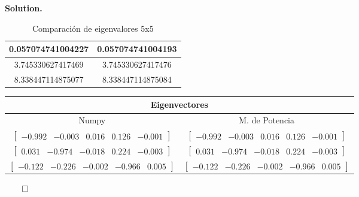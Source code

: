 \documentclass{article}
\theoremstyle{problemstyle}
\newenvironment{solution}{%
  \begin{mdframed}[linewidth=0.8pt,linecolor=Gray,backgroundcolor=Gray!5,roundcorner=5pt]%
  \noindent\textbf{Solution.}%
}{%
\hfill $ \qed $ 
  \end{mdframed}%
}
\begin{document}
\begin{solution}
\begin{table}[H]
\begin{center}
\begin{tabular}{|c|c|}
            0.057074741004227 & 0.057074741004193 \\
            \hline
            3.745330627417469 & 3.745330627417476 \\
            \hline
            8.338447114875077 & 8.338447114875084 \\
            \hline
        \end{tabular}
    \end{center}
    \caption{Comparaci\'on de eigenvalores 5x5}\label{tab:evals_comparison_small3}
\end{table}

\begin{table}[H]
    \begin{center}
        \begin{tabular}{|c|c|}
            \multicolumn{2}{c}{Eigenvectores}               \\
            \hline
            Numpy                   & M. de Potencia        \\
            \hline
            \rule{0pt}{1.5em}
            $ \begin{bmatrix}
                    -0.992 & -0.003 & 0.016 & 0.126 & -0.001
              \end{bmatrix} $ &
            $ \begin{bmatrix}
                    -0.992 & -0.003 & 0.016 & 0.126 & -0.001
              \end{bmatrix} $                        \\
            [0.5em]
            \hline
            \rule{0pt}{1.5em}
            $ \begin{bmatrix}
                    0.031 & -0.974 & -0.018 & 0.224 & -0.003
              \end{bmatrix} $ & $ \begin{bmatrix}
                                      0.031 & -0.974 & -0.018 & 0.224 & -0.003
                                  \end{bmatrix} $   \\
            [0.5em]
            \hline
            \rule{0pt}{1.5em}
            $ \begin{bmatrix}
                    -0.122 & -0.226 & -0.002 & -0.966 & 0.005
              \end{bmatrix} $  & $ \begin{bmatrix}
                                        -0.122 & -0.226 & -0.002 & -0.966 & 0.005
                                    \end{bmatrix} $ \\
            [0.5em]
            \hline
        \end{tabular}


\end{center}
\end{table}
\end{solution}
\end{document}
